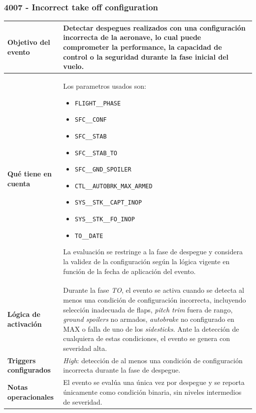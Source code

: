 \documentclass[11pt,a4paper]{article}
\begin{document}
	\subsubsection{4007 - Incorrect take off configuration}
	\begin{table}[H]
		\centering
		\renewcommand{\arraystretch}{1.3}
		\begin{tabular}{p{5cm} p{9.5cm}}
			\hline
			\textbf{Objetivo del evento} &
			Detectar despegues realizados con una configuración incorrecta de la aeronave, lo cual puede comprometer la performance, la capacidad de control o la seguridad durante la fase inicial del vuelo. \\
			\hline
			\textbf{Qué tiene en cuenta} & Los parametros usados son:
			\begin{itemize}
				\item \texttt{FLIGHT\_\_PHASE}
				\item \texttt{SFC\_\_CONF}
				\item \texttt{SFC\_\_STAB}
				\item \texttt{SFC\_\_STAB\_TO}
				\item \texttt{SFC\_\_GND\_SPOILER}
				\item \texttt{CTL\_\_AUTOBRK\_MAX\_ARMED}
				\item \texttt{SYS\_\_STK\_\_CAPT\_INOP}
				\item \texttt{SYS\_\_STK\_\_FO\_INOP}
				\item \texttt{TO\_\_DATE}
			\end{itemize}
			La evaluación se restringe a la fase de despegue y considera la validez de la configuración según la lógica vigente en función de la fecha de aplicación del evento. \\
			\hline
			\textbf{Lógica de activación} &
			Durante la fase \textit{TO}, el evento se activa cuando se detecta al menos una condición de configuración incorrecta, incluyendo selección inadecuada de flaps, \textit{pitch trim} fuera de rango, \textit{ground spoilers} no armados, \textit{autobrake} no configurado en MAX o falla de uno de los \textit{sidesticks}. Ante la detección de cualquiera de estas condiciones, el evento se genera con severidad alta. \\
			\hline
			\textbf{Triggers configurados} &
			\textit{High}: detección de al menos una condición de configuración incorrecta durante la fase de despegue. \\
			\hline
			\textbf{Notas operacionales} &
			El evento se evalúa una única vez por despegue y se reporta únicamente como condición binaria, sin niveles intermedios de severidad. \\
			\hline
		\end{tabular}
	\end{table}
\end{document}
